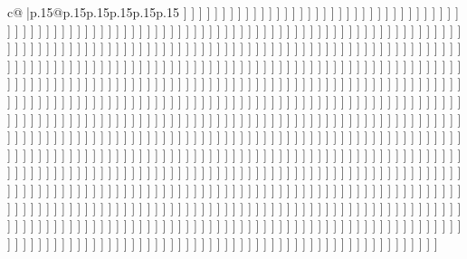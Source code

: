 \documentclass{article}
\begin{document}
{\begin{supertabular}{c@{$\;$}|p{.15\linewidth}@{}p{.15\linewidth}p{.15\linewidth}p{.15\linewidth}p{.15\linewidth}p{.15\linewidth}}
{{{{]} {]} {]} {]} {]} {]} {]} {]} {]} {]} {]} {]} {]} {]} {]} {]} {]} {]} {]} {]} {]} {]} {]} {]} {]} {]} {]} {]} {]} {]} {]} {]} {]} {]} {]} {]} {]} {]} {]} {]} {]} {]} {]} {]} {]} {]} {]} {]} {]} {]} {]} {]} {]} {]} {]} {]} {]} {]} {]} {]} {]} {]} {]} {]} {]} {]} {]} {]} {]} {]} {]} {]} {]} {]} {]} {]} {]} {]} {]} {]} {]} {]} {]} {]} {]} {]} {]} {]} {]} {]} {]} {]} {]} {]} {]} {]} {]} {]} {]} {]} {]} {]} {]} {]} {]} {]} {]} {]} {]} {]} {]} {]} {]} {]} {]} {]} {]} {]} {]} {]} {]} {]} {]} {]} {]} {]} {]} {]} {]} {]} {]} {]} {]} {]} {]} {]} {]} {]} {]} {]} {]} {]} {]} {]} {]} {]} {]} {]} {]} {]} {]} {]} {]} {]} {]} {]} {]} {]} {]} {]} {]} {]} {]} {]} {]} {]} {]} {]} {]} {]} {]} {]} {]} {]} {]} {]} {]} {]} {]} {]} {]} {]} {]} {]} {]} {]} {]} {]} {]} {]} {]} {]} {]} {]} {]} {]} {]} {]} {]} {]} {]} {]} {]} {]} {]} {]} {]} {]} {]} {]} {]} {]} {]} {]} {]} {]} {]} {]} {]} {]} {]} {]} {]} {]} {]} {]} {]} {]} {]} {]} {]} {]} {]} {]} {]} {]} {]} {]} {]} {]} {]} {]} {]} {]} {]} {]} {]} {]} {]} {]} {]} {]} {]} {]} {]} {]} {]} {]} {]} {]} {]} {]} {]} {]} {]} {]} {]} {]} {]} {]} {]} {]} {]} {]} {]} {]} {]} {]} {]} {]} {]} {]} {]} {]} {]} {]} {]} {]} {]} {]} {]} {]} {]} {]} {]} {]} {]} {]} {]} {]} {]} {]} {]} {]} {]} {]} {]} {]} {]} {]} {]} {]} {]} {]} {]} {]} {]} {]} {]} {]} {]} {]} {]} {]} {]} {]} {]} {]} {]} {]} {]} {]} {]} {]} {]} {]} {]} {]} {]} {]} {]} {]} {]} {]} {]} {]} {]} {]} {]} {]} {]} {]} {]} {]} {]} {]} {]} {]} {]} {]} {]} {]} {]} {]} {]} {]} {]} {]} {]} {]} {]} {]} {]} {]} {]} {]} {]} {]} {]} {]} {]} {]} {]} {]} {]} {]} {]} {]} {]} {]} {]} {]} {]} {]} {]} {]} {]} {]} {]} {]} {]} {]} {]} {]} {]} {]} {]} {]} {]} {]} {]} {]} {]} {]} {]} {]} {]} {]} {]} {]} {]} {]} {]} {]} {]} {]} {]} {]} {]} {]} {]} {]} {]} {]} {]} {]} {]} {]} {]} {]} {]} {]} {]} {]} {]} {]} {]} {]} {]} {]} {]} {]} {]} {]} {]} {]} {]} {]} {]} {]} {]} {]} {]} {]} {]} {]} {]} {]} {]} {]} {]} {]} {]} {]} {]} {]} {]} {]} {]} {]} {]} {]} {]} {]} {]} {]} {]} {]} {]} {]} {]} {]} {]} {]} {]} {]} {]} {]} {]} {]} {]} {]} {]} {]} {]} {]} {]} {]} {]} {]} {]} {]} {]} {]} {]} {]} {]} {]} {]} {]} {]} {]} {]} {]} {]} {]} {]} {]} {]} {]} {]} {]} {]} {]} {]} {]} {]} {]} {]} {]} {]} {]} {]} {]} {]} {]} {]} {]} {]} {]} {]} {]} {]} {]} {]} {]} {]} {]} {]} {]} {]} {]} {]} {]} {]} {]} {]} {]} {]} {]} {]} {]} {]} {]} {]} {]} {]} {]} {]} {]} {]} {]} {]} {]} {]} {]} {]} {]} {]} {]} {]} {]} {]} {]} {]} {]} {]} {]} {]} {]} {]} {]} {]} {]} {]} {]} {]} {]} {]} {]} {]} {]} {]} {]} {]} {]} {]} {]} {]} {]} {]} {]} {]} {]} {]} {]} {]} {]} {]} {]} {]} {]} {]} {]} {]} {]} {]} {]} {]} {]} {]} {]} {]} {]} {]} {]} {]} {]} {]} {]} {]} {]} {]} {]} {]} {]} {]} {]} {]} {]} {]} {]} {]} {]} {]} {]} {]} {]} {]} {]} {]} {]} {]} {]} {]} {]} {]} {]} {]} {]} {]} {]} {]} {]} {]} {]} {]} {]} {]} {]} {]} {]} {]} {]} {]} {]} {]} {]} {]} {]} {]} {]} {]} {]} {]} {]} {]} {]} {]} {]} {]} {]} {]} {]} {]} {]} {]} {]} {]} {]} {]} {]} {]} {]} {]} {]} {]} {]} {]} {]} {]} {]} {]} {]} {]} {]} {]} {]} {]} {]} {]} {]} {]} {]} {]} {]} {]} {]} {]} {]} {]} {]} {]} {]} {]} {]} {]} {]} {]} {]} {]} {]} {]} {]} {]} {]} {]} {]} {]} {]} {]} {]} {]} {]} {]} {]} {]} {]} {]} {]} {]} {]} {]} {]} {]} {]} {]} {]} {]} {]} {]} {]} {]} {]} {]} {]} {]} {]} {]} {]} }}}
\end{supertabular}}
\end{document}
